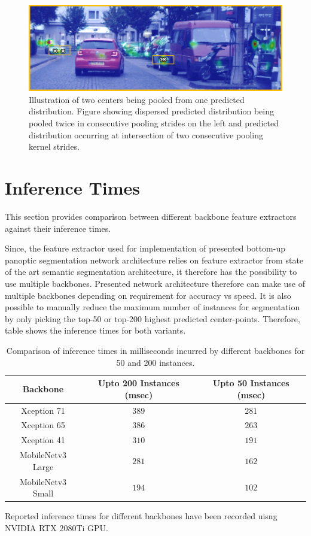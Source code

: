 \begin{figure}[H] %
    \includegraphics[width = \textwidth]{Graphics/Evaluations/failurecase_reason}
    \caption[Dual Pooling of Distributions]{Illustration of two centers being pooled from one predicted distribution. Figure showing dispersed predicted distribution being pooled twice in consecutive pooling strides on the left and predicted distribution occurring at intersection of two consecutive pooling kernel strides.}
    \label{fig:faliurecasereason}
\end{figure}
\newpage
\section{Inference Times}


This section provides comparison between different backbone feature extractors against their inference times. 

Since, the feature extractor used for implementation of presented bottom-up panoptic segmentation network architecture relies on feature extractor from state of the art semantic segmentation architecture, it therefore has the possibility to use multiple backbones. Presented network architecture therefore can make use of multiple backbones depending on requirement for accuracy vs speed. It is also possible to manually reduce the maximum number of instances for segmentation by only picking the top-50 or top-200 highest predicted center-points. Therefore, table shows the inference times for both variants. 

\begin{table}[!htp]
\begin{center}

\centering



\begin{tabular}{c|c|c} 
\hline
    Backbone & Upto 200 Instances (msec)&  Upto 50 Instances (msec) \\
    \hline Xception 71 & $389$ & $281$ \\
     Xception 65 & $386$ & $263$ \\
    Xception 41 & $310$ & $191$ \\
    MobileNetv3 Large & $281$ & $162$ \\
    MobileNetv3 Small & $194$ & $102$ \\
    \hline
\end{tabular}
\end{center}
\caption[Comparison of Inference Time with Backbones]{Comparison of inference times in milliseconds incurred by different backbones for 50 and 200 instances.}
\end{table}

Reported inference times for different backbones have been recorded uisng NVIDIA RTX 2080Ti GPU.





